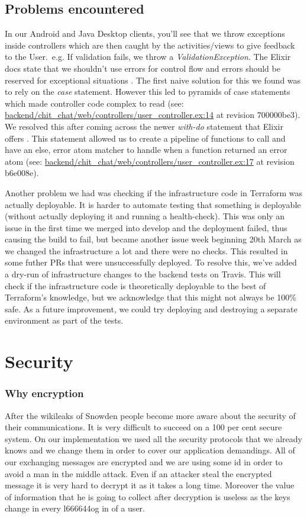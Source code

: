 \documentclass[11pt,a4paper]{report}
\begin{document}
\subsection{Problems encountered}

In our Android and Java Desktop clients, you'll see that we throw exceptions inside controllers which are then caught by the activities/views to give feedback to the User.\ e.g. If validation fails, we throw a \emph{ValidationException}. The Elixir docs state that we shouldn't use errors for control flow and errors should be reserved for exceptional situations \cite{website:elixir_error_flow}. The first naive solution for this we found was to rely on the \emph{case} statement. However this led to pyramids of case statements which made controller code complex to read (see: \url{backend/chit_chat/web/controllers/user_controller.ex:14} at revision 700000be3). We resolved this after coming across the newer \emph{with-do} statement that Elixir offers \cite{website:elixir_with}. This statement allowed us to create a pipeline of functions to call and have an else, error atom matcher to handle when a function returned an error atom (see: \url{backend/chit_chat/web/controllers/user_controller.ex:17} at revision b6e008e).

Another problem we had was checking if the infrastructure code in Terraform was actually deployable. It is harder to automate testing that something is deployable (without actually deploying it and running a health-check). This was only an issue in the first time we merged into develop and the deployment failed, thus causing the build to fail, but became another issue week beginning 20th March as we changed the infrastructure a lot and there were no checks. This resulted in some futher PRs that were unsuccessfully deployed. To resolve this, we've added a dry-run of infrastructure changes to the backend tests on Travis. This will check if the infrastructure code is theoretically deployable to the best of Terraform's knowledge, but we acknowledge that this might not always be 100\% safe. As a future improvement, we could try deploying and destroying a separate environment as part of the tests.


\section{Security}
\subsubsection{Why encryption}
After the wikileaks of Snowden people become more aware about the security of their communications. It is very difficult to succeed on a 100 per cent secure system. On our implementation we used all the security protocols that we already knows and we change them in order to cover our application demandings. All of our exchanging messages are encrypted and we are using some id in order to avoid a man in the middle attack. Even if an attacker steal the encrypted message it is very hard to decrypt it as it takes a long time. Moreover the value of information that he is going to collect after decryption is useless as the keys change in every l666644og in of a user.
\end{document}
